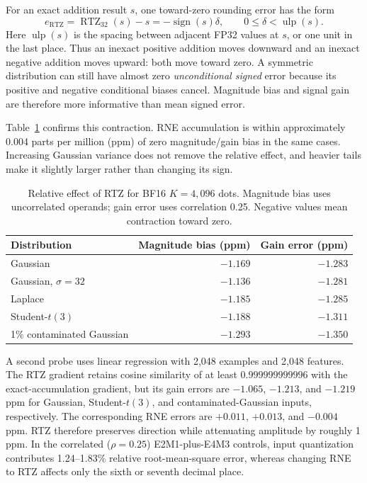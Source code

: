 \documentclass[11pt]{article}
\begin{document}
For an exact addition result $s$, one toward-zero rounding error has the form
\begin{equation}
  e_{\mathrm{RTZ}} = \operatorname{RTZ}_{32}(s)-s
  = -\operatorname{sign}(s)\delta,
  \qquad 0 \leq \delta < \operatorname{ulp}(s).
  \label{eq:rz-contraction}
\end{equation}
Here $\operatorname{ulp}(s)$ is the spacing between adjacent FP32 values at
$s$, or one unit in the last place.
Thus an inexact positive addition moves downward and an inexact negative
addition moves upward: both move toward zero.  A symmetric distribution can
still have almost zero \emph{unconditional signed} error because its positive
and negative conditional biases cancel.  Magnitude bias and signal gain are
therefore more informative than mean signed error.

Table~\ref{tab:rz-statistics} confirms this contraction.  RNE accumulation is
within approximately 0.004 parts per million (ppm) of zero magnitude/gain bias
in the same cases.  Increasing Gaussian variance does not remove the relative
effect, and heavier tails make it slightly larger rather than changing its
sign.

\begin{table}[H]
  \centering
  \small
  \caption{Relative effect of RTZ for BF16 $K=4{,}096$ dots.  Magnitude bias uses
  uncorrelated operands; gain error uses correlation 0.25.  Negative values
  mean contraction toward zero.}
  \label{tab:rz-statistics}
  \begin{tabular}{@{}lrr@{}}
    \toprule
    Distribution & Magnitude bias (ppm) & Gain error (ppm) \\
    \midrule
    Gaussian & $-1.169$ & $-1.283$ \\
    Gaussian, $\sigma=32$ & $-1.136$ & $-1.281$ \\
    Laplace & $-1.185$ & $-1.285$ \\
    Student-$t(3)$ & $-1.188$ & $-1.311$ \\
    1\% contaminated Gaussian & $-1.293$ & $-1.350$ \\
    \bottomrule
  \end{tabular}
\end{table}

A second probe uses linear regression with 2,048 examples and 2,048 features.
The RTZ gradient retains cosine similarity of at least
$0.999999999996$ with the exact-accumulation gradient, but its gain errors are
$-1.065$, $-1.213$, and $-1.219$ ppm for Gaussian, Student-$t(3)$, and
contaminated-Gaussian inputs, respectively.  The corresponding RNE errors are
$+0.011$, $+0.013$, and $-0.004$ ppm.  RTZ therefore preserves direction while
attenuating amplitude by roughly 1 ppm.  In the correlated ($\rho=0.25$)
E2M1-plus-E4M3 controls, input quantization contributes 1.24--1.83\% relative
root-mean-square error, whereas changing RNE to RTZ affects only the sixth or
seventh decimal place.
\end{document}
